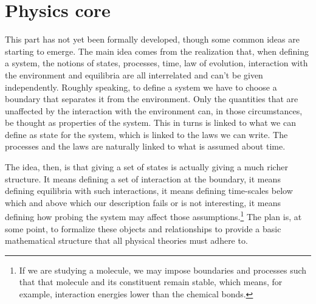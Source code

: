 \documentclass[twocolumn]{article}
\newif\ifextended
\newcommand\fact[2]{\ifextended \emph{#1}. #2 \fi}
\begin{document}
\fact{Granularity as foundational concept} {As each statement corresponds to a Borel set of possibilities, assigning a size to these sets effectively means giving a size to the statements themselves. For geometry, two sets have the same volume because they contain the same number of possible spatial points. For probability, borrowing idea from Cox probable inference, we would assign probability only on conditional statements, therefore the $P(s_1 | s_2)$ would measure what fraction of the possibilities compatible with $s_2$ are also compatible with $s_1$. For information theory, given two statements the logarithm of the ratio of the size of the possibilities corresponds to the number of yes/no questions that are needed to go from one statement to the other, the relative information.}

\fact{Recover differential geometry or geometry measure theory} {The idea is to start with finite functions of finite k-dimensional surfaces that have the following properties: they are linear if the surface is broken into disjoint parts (the value for the whole is the sum of the values for the parts) and they respect the limit (the value for the limit surface is the limit of the sequence of values for the surfaces). Under these, and possibly others, conditions we expect these functions to be expressed through an integral of local functions (i.e. k-forms) over infinitesimal surfaces (i.e. k-vectors).}

\section{Physics core}

This part has not yet been formally developed, though some common ideas are starting to emerge. The main idea comes from the realization that, when defining a system, the notions of states, processes, time, law of evolution, interaction with the environment and equilibria are all interrelated and can't be given independently. Roughly speaking, to define a system we have to choose a boundary that separates it from the environment. Only the quantities that are unaffected by the interaction with the environment can, in those circumstances, be thought as properties of the system. This in turns is linked to what we can define as state for the system, which is linked to the laws we can write. The processes and the laws are naturally linked to what is assumed about time.

The idea, then, is that giving a set of states is actually giving a much richer structure. It means defining a set of interaction at the boundary, it means defining equilibria with such interactions, it means defining time-scales below which and above which our description fails or is not interesting, it means defining how probing the system may affect those assumptions.\footnote{If we are studying a molecule, we may impose boundaries and processes such that that molecule and its constituent remain stable, which means, for example, interaction energies lower than the chemical bonds.} The plan is, at some point, to formalize these objects and relationships to provide a basic mathematical structure that all physical theories must adhere to.
\end{document}
